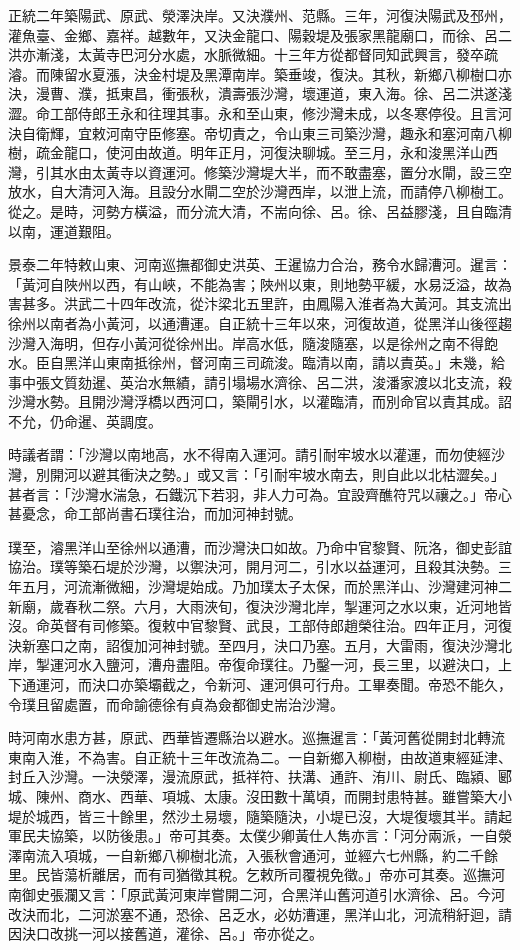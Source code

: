 正統二年築陽武、原武、滎澤決岸。又決濮州、范縣。三年，河復決陽武及邳州，灌魚臺、金鄉、嘉祥。越數年，又決金龍口、陽穀堤及張家黑龍廟口，而徐、呂二洪亦漸淺，太黃寺巴河分水處，水脈微細。十三年方從都督同知武興言，發卒疏濬。而陳留水夏漲，決金村堤及黑潭南岸。築垂竣，復決。其秋，新鄉八柳樹口亦決，漫曹、濮，抵東昌，衝張秋，潰壽張沙灣，壞運道，東入海。徐、呂二洪遂淺澀。命工部侍郎王永和往理其事。永和至山東，修沙灣未成，以冬寒停役。且言河決自衛輝，宜敕河南守臣修塞。帝切責之，令山東三司築沙灣，趣永和塞河南八柳樹，疏金龍口，使河由故道。明年正月，河復決聊城。至三月，永和浚黑洋山西灣，引其水由太黃寺以資運河。修築沙灣堤大半，而不敢盡塞，置分水閘，設三空放水，自大清河入海。且設分水閘二空於沙灣西岸，以泄上流，而請停八柳樹工。從之。是時，河勢方橫溢，而分流大清，不耑向徐、呂。徐、呂益膠淺，且自臨清以南，運道艱阻。

景泰二年特敕山東、河南巡撫都御史洪英、王暹協力合治，務令水歸漕河。暹言：「黃河自陜州以西，有山峽，不能為害；陜州以東，則地勢平緩，水易泛溢，故為害甚多。洪武二十四年改流，從汴梁北五里許，由鳳陽入淮者為大黃河。其支流出徐州以南者為小黃河，以通漕運。自正統十三年以來，河復故道，從黑洋山後徑趨沙灣入海明，但存小黃河從徐州出。岸高水低，隨浚隨塞，以是徐州之南不得飽水。臣自黑洋山東南抵徐州，督河南三司疏浚。臨清以南，請以責英。」未幾，給事中張文質劾暹、英治水無績，請引塌場水濟徐、呂二洪，浚潘家渡以北支流，殺沙灣水勢。且開沙灣浮橋以西河口，築閘引水，以灌臨清，而別命官以責其成。詔不允，仍命暹、英調度。

時議者謂：「沙灣以南地高，水不得南入運河。請引耐牢坡水以灌運，而勿使經沙灣，別開河以避其衝決之勢。」或又言：「引耐牢坡水南去，則自此以北枯澀矣。」甚者言：「沙灣水湍急，石鐵沉下若羽，非人力可為。宜設齊醮符咒以禳之。」帝心甚憂念，命工部尚書石璞往治，而加河神封號。

璞至，濬黑洋山至徐州以通漕，而沙灣決口如故。乃命中官黎賢、阮洛，御史彭誼協治。璞等築石堤於沙灣，以禦決河，開月河二，引水以益運河，且殺其決勢。三年五月，河流漸微細，沙灣堤始成。乃加璞太子太保，而於黑洋山、沙灣建河神二新廟，歲春秋二祭。六月，大雨浹旬，復決沙灣北岸，掣運河之水以東，近河地皆沒。命英督有司修築。復敕中官黎賢、武艮，工部侍郎趙榮往治。四年正月，河復決新塞口之南，詔復加河神封號。至四月，決口乃塞。五月，大雷雨，復決沙灣北岸，掣運河水入鹽河，漕舟盡阻。帝復命璞往。乃鑿一河，長三里，以避決口，上下通運河，而決口亦築壩截之，令新河、運河俱可行舟。工畢奏聞。帝恐不能久，令璞且留處置，而命諭德徐有貞為僉都御史耑治沙灣。

時河南水患方甚，原武、西華皆遷縣治以避水。巡撫暹言：「黃河舊從開封北轉流東南入淮，不為害。自正統十三年改流為二。一自新鄉入柳樹，由故道東經延津、封丘入沙灣。一決滎澤，漫流原武，抵祥符、扶溝、通許、洧川、尉氏、臨潁、郾城、陳州、商水、西華、項城、太康。沒田數十萬頃，而開封患特甚。雖嘗築大小堤於城西，皆三十餘里，然沙土易壞，隨築隨決，小堤已沒，大堤復壞其半。請起軍民夫協築，以防後患。」帝可其奏。太僕少卿黃仕人雋亦言：「河分兩派，一自滎澤南流入項城，一自新鄉八柳樹北流，入張秋會通河，並經六七州縣，約二千餘里。民皆蕩析離居，而有司猶徵其稅。乞敕所司覆視免徵。」帝亦可其奏。巡撫河南御史張瀾又言：「原武黃河東岸嘗開二河，合黑洋山舊河道引水濟徐、呂。今河改決而北，二河淤塞不通，恐徐、呂乏水，必妨漕運，黑洋山北，河流稍紆迴，請因決口改挑一河以接舊道，灌徐、呂。」帝亦從之。

